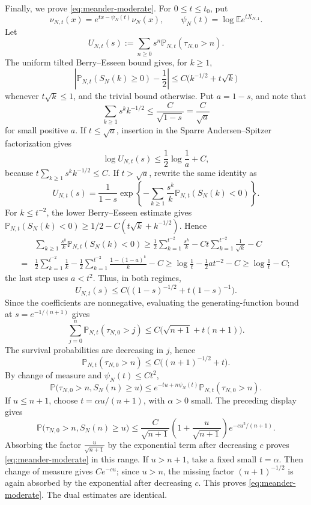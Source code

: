 \documentclass[11pt]{article}
\theoremstyle{plain}
\theoremstyle{definition}
\theoremstyle{remark}
\newcommand{\Pp}{\mathbb P}
\newcommand{\Ee}{\mathbb E}
\begin{document}
Finally, we prove \eqref{eq:meander-moderate}. For
\(0\le t\le t_0\), put
\[
 \nu_{N,t}(x)=e^{tx-\psi_N(t)}\nu_N(x),
 \qquad \psi_N(t)=\log\Ee e^{tX_{N,1}}.
\]
Let
\[
 U_{N,t}(s):=\sum_{n\ge0}s^n\Pp_{N,t}(\tau_{N,0}>n).
\]
The uniform tilted Berry--Esseen bound gives, for \(k\ge1\),
\[
 \left|\Pp_{N,t}(S_N(k)\ge0)-\frac12\right|
 \le C\bigl(k^{-1/2}+t\sqrt{k}\bigr)
\]
whenever \(t\sqrt{k}\le1\), and the trivial bound otherwise.  Put
\(a=1-s\), and note that \[\sum_{k\ge 1}s^kk^{-1/2}\le \frac{C}{\sqrt{1-s}}=\frac{C}{\sqrt{a}}\] for small positive $a$.  If \(t\le\sqrt a\), insertion in the
Sparre Andersen--Spitzer factorization gives
\[
 \log U_{N,t}(s)
 \le \frac12\log\frac1a+C,
\]
because \(t\sum_{k\ge1}s^k k^{-1/2}\le C\).  If
\(t>\sqrt a\), rewrite the same identity as
\[
 U_{N,t}(s)=\frac1{1-s}
 \exp\left\{-\sum_{k\ge1}\frac{s^k}{k}
                 \Pp_{N,t}(S_N(k)<0)\right\}.
\]
For \(k\le t^{-2}\), the lower Berry--Esseen estimate gives
\(\Pp_{N,t}(S_N(k)<0)\ge
1/2-C(t\sqrt{k}+k^{-1/2})\).  Hence
\begin{align*}
 &\sum_{k\ge1}\frac{s^k}{k}\Pp_{N,t}(S_N(k)<0)
 \ge \frac12\sum_{k=1}^{t^{-2}}\frac{s^k}{k}-Ct\sum_{k=1}^{t^{-2}}\frac{1}{\sqrt{k}}-C\\
 =&\frac{1}{2}\sum_{k=1}^{t^{-2}}\frac{1}{k}-\frac{1}{2}\sum_{k=1}^{t^{-2}}\frac{1-(1-a)^{k}}{k}-C\ge\log\frac{1}{t}-\frac{1}{2}at^{-2}-C\ge  \log\frac1t-C;
\end{align*}
the last step uses \(a<t^2\).  Thus, in both regimes,
\begin{equation*}
 U_{N,t}(s)
 \le C\bigl((1-s)^{-1/2}+t(1-s)^{-1}\bigr).
\end{equation*}
Since the coefficients are nonnegative, evaluating the generating-function
bound at \(s=e^{-1/(n+1)}\) gives
\[
 \sum_{j=0}^n \Pp_{N,t}(\tau_{N,0}>j)
 \le C\bigl(\sqrt{n+1}+t(n+1)\bigr).
\]
The survival probabilities are decreasing in \(j\), hence
\begin{equation}\label{eq:survivingprobtilted}
 \Pp_{N,t}(\tau_{N,0}>n)
 \le C\bigl((n+1)^{-1/2}+t\bigr).
\end{equation}
By change of measure and \(\psi_N(t)\le Ct^2\),
\[
 \Pp\bigl(\tau_{N,0}>n,S_N(n)\ge u\bigr)
 \le e^{-tu+n\psi_N(t)}\Pp_{N,t}(\tau_{N,0}>n).
\]
If \(u\le n+1\), choose \(t=\alpha u/(n+1)\), with \(\alpha>0\)
small.  The preceding display gives
\[
 \Pp\bigl(\tau_{N,0}>n,S_N(n)\ge u\bigr)
 \le
 \frac{C}{\sqrt{n+1}}
 \left(1+\frac{u}{\sqrt{n+1}}\right)
 e^{-c u^2/(n+1)}.
\]
Absorbing the factor $\frac{u}{\sqrt{n+1}}$ by the exponential term after decreasing \(c\) proves
\eqref{eq:meander-moderate} in this range. If \(u>n+1\), take a fixed
small \(t=\alpha\).  Then change of measure gives \(Ce^{-cu}\); since
\(u>n\), the missing factor \((n+1)^{-1/2}\) is again absorbed by the exponential after decreasing
\(c\).  This proves 
\eqref{eq:meander-moderate}. The dual estimates are identical.
\end{document}
